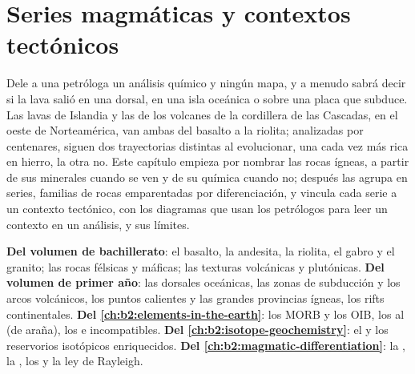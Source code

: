 \chapter{Series magmáticas y contextos tectónicos}\label{ch:b2:magmatic-series}

Dele a una petróloga un análisis químico y ningún mapa, y a menudo sabrá decir si la
lava salió en una dorsal, en una isla oceánica o sobre una placa que subduce. Las lavas
de Islandia y las de los volcanes de la cordillera de las Cascadas, en el oeste de Norteamérica, van ambas
del basalto a la riolita; analizadas por centenares, siguen dos trayectorias distintas al
evolucionar, una cada vez más rica en hierro, la otra no. Este capítulo empieza por
nombrar las rocas ígneas, a partir de sus minerales cuando se ven y de su
química cuando no; después las agrupa en series, familias de rocas
emparentadas por diferenciación, y vincula cada serie a un contexto tectónico, con los
diagramas que usan los petrólogos para leer un contexto en un análisis, y sus límites.

\begin{recall}
\textbf{Del volumen de bachillerato}: el basalto, la andesita, la riolita, el gabro y el granito;
las rocas félsicas y máficas; las texturas volcánicas y plutónicas. \textbf{Del volumen de primer
año}: las dorsales oceánicas, las zonas de subducción y los arcos volcánicos, los puntos calientes y las grandes
provincias ígneas, los rifts continentales. \textbf{Del \cref{ch:b2:elements-in-the-earth}}:
los MORB y los OIB, los  al  (de araña), los  e
incompatibles. \textbf{Del \cref{ch:b2:isotope-geochemistry}}: el  y los reservorios isotópicos enriquecidos. \textbf{Del
\cref{ch:b2:magmatic-differentiation}}: la , la , los  y la ley de Rayleigh.
\end{recall}

